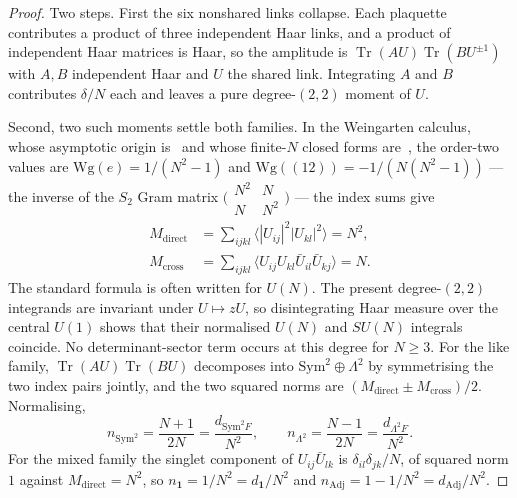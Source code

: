 \documentclass[11pt]{article}
\theoremstyle{plain}
\theoremstyle{definition}
\theoremstyle{remark}
\newcommand{\chk}[1]{}
\begin{document}
\begin{proof}
Two steps. First the six nonshared links collapse. Each plaquette contributes
a product of three independent Haar links, and a product of independent Haar
matrices is Haar, so the amplitude is
$\operatorname{Tr}(AU)\operatorname{Tr}(BU^{\pm1})$ with $A,B$ independent
Haar and $U$ the shared link. Integrating $A$ and $B$ contributes
$\delta/N$ each and leaves a pure degree-$(2,2)$ moment of $U$.

Second, two such moments settle both families. In the Weingarten calculus,
whose asymptotic origin is~\cite{Weingarten1978} and whose finite-$N$ closed
forms are~\cite{CollinsSniady2006}, the order-two values are
$\mathrm{Wg}(e)=1/(N^2-1)$ and
$\mathrm{Wg}((12))=-1/(N(N^2-1))$ --- the inverse of the $S_2$ Gram matrix
$\bigl(\begin{smallmatrix}N^2&N\\N&N^2\end{smallmatrix}\bigr)$ --- the index
sums give
\begin{equation}\label{eq:moments}
  \begin{aligned}
    M_{\mathrm{direct}}&=\sum_{ijkl}\bigl\langle|U_{ij}|^2|U_{kl}|^2\bigr\rangle=N^2,\\
    M_{\mathrm{cross}}&=\sum_{ijkl}\bigl\langle U_{ij}U_{kl}\bar U_{il}\bar U_{kj}\bigr\rangle=N .
  \end{aligned}
\end{equation}
The standard formula is often written for $U(N)$. The present degree-$(2,2)$
integrands are invariant under $U\mapsto zU$, so disintegrating Haar measure
over the central $U(1)$ shows that their normalised $U(N)$ and $SU(N)$
integrals coincide. No determinant-sector term occurs at this degree for
$N\ge3$.
For the like family, $\operatorname{Tr}(AU)\operatorname{Tr}(BU)$ decomposes
into $\mathrm{Sym}^2\oplus\Lambda^2$ by symmetrising the two index pairs
jointly, and the two squared norms are
$(M_{\mathrm{direct}}\pm M_{\mathrm{cross}})/2$. Normalising,
\[
  n_{\mathrm{Sym}^2}=\frac{N+1}{2N}=\frac{d_{\mathrm{Sym}^2F}}{N^2},
  \qquad
  n_{\Lambda^2}=\frac{N-1}{2N}=\frac{d_{\Lambda^2F}}{N^2}.
\]
For the mixed family the singlet component of $U_{ij}\bar U_{lk}$ is
$\delta_{il}\delta_{jk}/N$, of squared norm $1$ against
$M_{\mathrm{direct}}=N^2$, so $n_{\mathbf 1}=1/N^2=d_{\mathbf 1}/N^2$ and
$n_{\mathrm{Adj}}=1-1/N^2=d_{\mathrm{Adj}}/N^2$.
\end{proof}
\chk{the shared-link weights are Weingarten, not an isotropy assumption}
\end{document}
